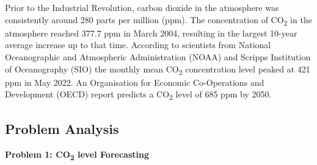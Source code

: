\documentclass[12pt]{mcmthesis}
\begin{document}
    Prior to the Industrial Revolution, carbon dioxide in the atmosphere was consistently around 280 parts per million (ppm).
    The concentration of CO\textsubscript{2} in the atmosphere reached 377.7 ppm in March 2004, resulting in the largest 10-year average increase up to that time.
    According to scientists from National Oceanographic and Atmospheric Administration (NOAA) and Scripps Institution of Oceanography (SIO) the monthly mean CO\textsubscript{2} concentration level peaked at 421 ppm in May 2022.
    An Organisation for Economic Co-Operations and Development (OECD) report predicts a CO\textsubscript{2} level of 685 ppm by 2050.

    \subsection{Problem Analysis}
    \noindent\textbf{Problem 1: CO\textsubscript{2} level Forecasting}
\end{document}
